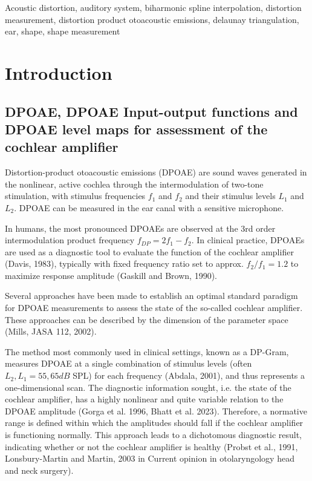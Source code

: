 \documentclass[journal,twoside,web]{ieeecolor2}
\begin{document}
\begin{IEEEkeywords}
Acoustic distortion,
auditory system,
biharmonic spline interpolation,
distortion measurement,
distortion product otoacoustic emissions,
delaunay triangulation,
ear,
shape,
shape measurement
\end{IEEEkeywords}

\section{Introduction}
\label{sec:introduction}
\subsection{DPOAE, DPOAE Input-output functions and DPOAE level maps for assessment of the cochlear amplifier}
Distortion-product otoacoustic emissions (DPOAE) are sound waves generated in the nonlinear, active cochlea through the intermodulation of two-tone stimulation, with stimulus frequencies $f_1$ and $f_2$ and their stimulus levels $L_1$ and $L_2$.
DPOAE can be measured in the ear canal with a sensitive microphone.

In humans, the most pronounced DPOAEs are observed at the 3rd order intermodulation product frequency $f_{DP} = 2f_1 - f_2$.
In clinical practice, DPOAEs are used as a diagnostic tool to evaluate the function of the cochlear amplifier (Davis, 1983), typically with fixed frequency ratio set to approx. $f_2 / f_1 = 1.2$ to maximize response amplitude (Gaskill and Brown, 1990).

Several approaches have been made to establish an optimal standard paradigm for DPOAE measurements to assess the state of the so-called cochlear amplifier.
These approaches can be described by the dimension of the parameter space (Mills, JASA 112, 2002).

The method most commonly used in clinical settings, known as a DP-Gram, measures DPOAE at a single combination of stimulus levels (often $L_2, L_1 = 55, 65 dB$ SPL) for each frequency (Abdala, 2001), and thus represents a one-dimensional scan.
The diagnostic information sought, i.e. the state of the cochlear amplifier, has a highly nonlinear and quite variable relation to the DPOAE amplitude (Gorga et al. 1996, Bhatt et al. 2023).
Therefore, a normative range is defined within which the amplitudes should fall if the cochlear amplifier is functioning normally.
This approach leads to a dichotomous diagnostic result, indicating whether or not the cochlear amplifier is healthy (Probst et al., 1991, Lonsbury-Martin and Martin, 2003 in Current opinion in otolaryngology head and neck surgery).
 
\end{document}
